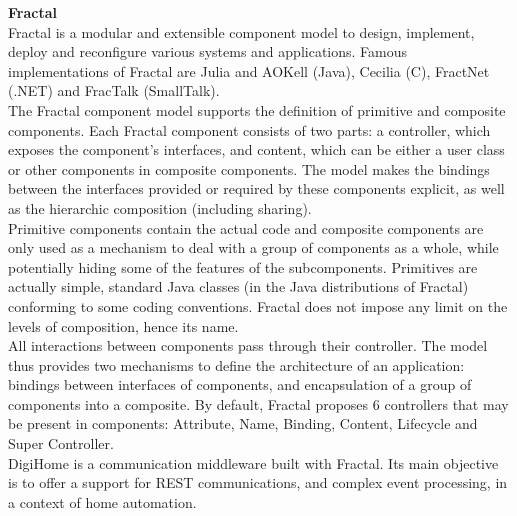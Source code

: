 \vspace{0.5cm}

{\bf Fractal}\\

Fractal\cite{Bruneton:2006} is a modular and extensible component model to design, implement, deploy and reconfigure various systems and applications. Famous implementations of Fractal are Julia and AOKell (Java), Cecilia (C), FractNet (.NET) and FracTalk (SmallTalk).\\
The Fractal component model supports the definition of primitive and composite components. Each Fractal component consists of two parts: a controller, which exposes the component's interfaces, and content, which can be either a user class or other components in composite components. The model makes the bindings between the interfaces provided or required by these components explicit, as well as the hierarchic composition (including sharing).\\
Primitive components contain the actual code and composite components are only used as a mechanism to deal with a group of components as a whole, while potentially hiding some of the features of the subcomponents. Primitives are actually simple, standard Java classes (in the Java distributions of Fractal) conforming to some coding conventions. Fractal does not impose any limit on the levels of composition, hence its name.\\
All interactions between components pass through their controller. The model thus provides two mechanisms to define the architecture of an application: bindings between interfaces of components, and encapsulation of a group of components into a composite. By default, Fractal proposes 6 controllers that may be present in components: Attribute, Name, Binding, Content, Lifecycle and Super Controller.\\
DigiHome\cite{Romero:2010} is a communication middleware built with Fractal. Its main objective is to offer a support for REST communications, and complex event processing, in a context of home automation.

